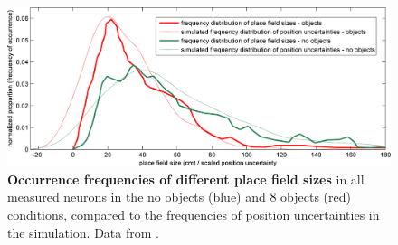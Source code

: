 \begin{figure}[!ht]
	\begin{center}
		\includegraphics[width=\textwidth]{img/burkefreqdist}
	\end{center}
	\caption{
		{\bf Occurrence frequencies of different place field sizes} in all measured neurons in the no
		objects (blue) and 8 objects (red) conditions, compared to the frequencies of position uncertainties in
		the simulation. Data from \citep{burke2011influence}. 
	}
	\label{distr}
\end{figure}



%
%
%
%
%
%
%
%
%
%
